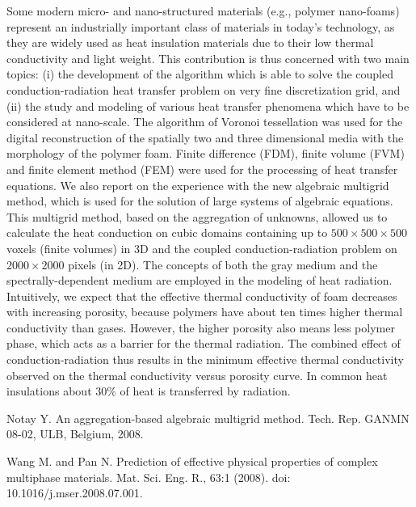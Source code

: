 Some modern micro- and nano-structured materials (e.g., polymer
nano-foams) represent an industrially important class of materials
in today's technology, as they are widely used as heat insulation
materials due to their low thermal conductivity and light weight.
This contribution is thus concerned with two main topics: (i) the
development of the algorithm which is able to solve the coupled
conduction-radiation heat transfer problem on very fine
discretization grid, and (ii) the study and modeling of various
heat transfer phenomena which have to be considered at nano-scale.
The algorithm of Voronoi tessellation was used for the digital
reconstruction of the spatially two and three dimensional media
with the morphology of the polymer foam. Finite difference (FDM),
finite volume (FVM) and finite element method (FEM) were used for
the processing of heat transfer equations. We also report on the
experience with the new algebraic multigrid method, which is used
for the solution of large systems of algebraic equations. This
multigrid method, based on the aggregation of unknowns, allowed us
to calculate the heat conduction on cubic domains containing up to
 $500 \times 500 \times 500$ voxels (finite volumes) in 3D and
the coupled conduction-radiation problem on $2000 \times 2000$
pixels (in 2D). The concepts of both the gray medium and the
spectrally-dependent medium are employed in the modeling of heat
radiation. Intuitively, we expect that the effective thermal
conductivity of foam decreases with increasing porosity, because
polymers have about ten times higher thermal conductivity than
gases. However, the higher porosity also means less polymer phase,
which acts as a barrier for the thermal radiation. The combined
effect of conduction-radiation thus results in the minimum
effective thermal conductivity observed on the thermal
conductivity versus porosity curve. In common heat insulations
about 30\% of heat is transferred by radiation.



\begin{thebibliography}{10}

{\sc Notay Y}. {An aggregation-based algebraic multigrid method}. Tech. Rep. GANMN 08-02, ULB, Belgium, 2008.



{\sc Wang M. and Pan N}. {Prediction of effective physical properties of complex multiphase materials}. Mat. Sci. Eng. R., 63:1 (2008). doi: 10.1016/j.mser.2008.07.001.

\end{thebibliography}
